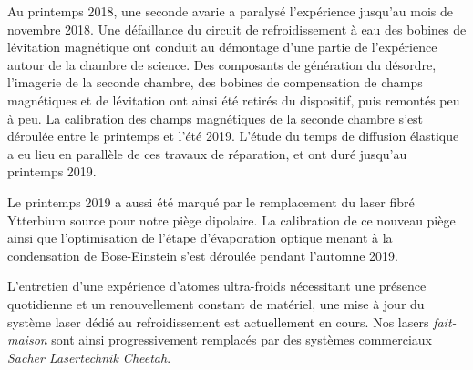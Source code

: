 Au printemps 2018, une seconde avarie a paralysé l'expérience jusqu'au mois de novembre 2018. Une défaillance du circuit de refroidissement à eau des bobines de lévitation magnétique ont conduit au démontage d'une partie de l'expérience autour de la chambre de science. Des composants de génération du désordre, l'imagerie de la seconde chambre, des bobines de compensation de champs magnétiques et de lévitation ont ainsi été retirés du dispositif, puis remontés peu à peu. La calibration des champs magnétiques de la seconde chambre s'est déroulée entre le printemps et l'été 2019. L'étude du temps de diffusion élastique a eu lieu en parallèle de ces travaux de réparation, et ont duré jusqu'au printemps 2019.

Le printemps 2019 a aussi été marqué par le remplacement du laser fibré Ytterbium source pour notre piège dipolaire. La calibration de ce nouveau piège ainsi que l'optimisation de l'étape d'évaporation optique menant à la condensation de Bose-Einstein s'est déroulée pendant l'automne 2019. 

L'entretien d'une expérience d'atomes ultra-froids nécessitant une présence quotidienne et un renouvellement constant de matériel, une mise à jour du système laser dédié au refroidissement est actuellement en cours. Nos lasers \emph{fait-maison} sont ainsi progressivement remplacés par des systèmes commerciaux \emph{Sacher Lasertechnik Cheetah}.




